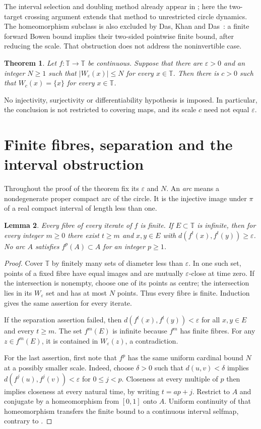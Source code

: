 \documentclass[11pt]{article}
\newtheorem{theorem}{Theorem}
\newtheorem{lemma}[theorem]{Lemma}
\newcommand{\T}{\mathbb T}
\begin{document}
The interval selection and doubling method already appear in \cite[Remark 3.6 and Lemma 3.7, pp.~8--9]{GGO}; here the two-target crossing argument extends that method to unrestricted circle dynamics. The homeomorphism subclass is also excluded by Das, Khan and Das~\cite[Corollary 3.16, p.~9]{DKD}: a finite forward Bowen bound implies their two-sided pointwise finite bound, after reducing the scale. That obstruction does not address the noninvertible case.

\begin{theorem}\label{thm:main}
Let $f:\T\to\T$ be continuous. Suppose that there are $\varepsilon>0$ and an integer $N\ge1$ such that $|W_\varepsilon(x)|\le N$ for every $x\in\T$. Then there is $c>0$ such that $W_c(x)=\{x\}$ for every $x\in\T$.
\end{theorem}
No injectivity, surjectivity or differentiability hypothesis is imposed. In particular, the conclusion is not restricted to covering maps, and its scale $c$ need not equal $\varepsilon$.

\section{Finite fibres, separation and the interval obstruction}
Throughout the proof of the theorem fix its $\varepsilon$ and $N$. An \emph{arc} means a nondegenerate proper compact arc of the circle. It is the injective image under $\pi$ of a real compact interval of length less than one.

\begin{lemma}\label{lem:basic}
Every fibre of every iterate of $f$ is finite. If $E\subset\T$ is infinite, then for every integer $m\ge0$ there exist $t\ge m$ and $x,y\in E$ with $d(f^t(x),f^t(y))\ge\varepsilon$. No arc $A$ satisfies $f^p(A)\subset A$ for an integer $p\ge1$.
\end{lemma}
\begin{proof}
Cover $\T$ by finitely many sets of diameter less than $\varepsilon$. In one such set, points of a fixed fibre have equal images and are mutually $\varepsilon$-close at time zero. If the intersection is nonempty, choose one of its points as centre; the intersection lies in its $W_\varepsilon$ set and has at most $N$ points. Thus every fibre is finite. Induction gives the same assertion for every iterate.

If the separation assertion failed, then $d(f^t(x),f^t(y))<\varepsilon$ for all $x,y\in E$ and every $t\ge m$. The set $f^m(E)$ is infinite because $f^m$ has finite fibres. For any $z\in f^m(E)$, it is contained in $W_\varepsilon(z)$, a contradiction.

For the last assertion, first note that $f^p$ has the same uniform cardinal bound $N$ at a possibly smaller scale. Indeed, choose $\delta>0$ such that $d(u,v)<\delta$ implies $d(f^j(u),f^j(v))<\varepsilon$ for $0\le j<p$. Closeness at every multiple of $p$ then implies closeness at every natural time, by writing $t=ap+j$. Restrict to $A$ and conjugate by a homeomorphism from $[0,1]$ onto $A$. Uniform continuity of that homeomorphism transfers the finite bound to a continuous interval selfmap, contrary to \cite[Theorem 3.8, Section 3.1, p.~9]{GGO}.
\end{proof}
\end{document}
